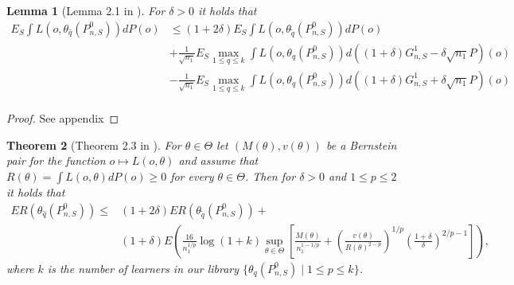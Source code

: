 \documentclass[11pt, a4paper]{article}
\newtheorem{theorem}{Theorem}
\newtheorem{lemma}[theorem]{Lemma}
\theoremstyle{definition}
\theoremstyle{remark}
\newcommand{\cl}{q}
\begin{document}
\begin{lemma}[Lemma 2.1 in \cite{vaart06}]
   For $ \delta > 0 $ it holds that
   \begin{align*}
       E_{S} \int L(o, \theta_{ \hat{\cl}}(P_{n, S}^{0})) dP(o) &\leq (1 + 2 \delta) E_{S} \int L(o, \theta_{ \tilde{\cl} }(P_{n, S}^{0})) d P(o) \\ 
                                                                &+\frac{1}{\sqrt{n_1} } E_{S} \max_{1 \leq \cl \leq k} \int L(o, \theta_{\cl}(P_{n, S}^{0})) d ((1 + \delta) G_{n,S}^{1} - \delta \sqrt{n_1} P)(o)  \\
                                                                &-\frac{1}{\sqrt{n_1} } E_{S} \max_{1 \leq \cl \leq k} \int L(o, \theta_{\cl}(P_{n, S}^{0})) d ((1 + \delta) G_{n,S}^{1} + \delta \sqrt{n_1} P)(o)  \\
   \end{align*}
\end{lemma}
\begin{proof}
    See appendix
\end{proof}
\begin{theorem}[Theorem 2.3 in \cite{vaart06}] \label{finitesample}
   For $ \theta \in \Theta $ let $ (M(\theta) , v(\theta)) $ be a Bernstein pair for the function $ o \mapsto L(o, \theta) $ and assume that $ R(\theta) = \int L(o, \theta) d P(o) \geq 0 $ for every $ \theta \in \Theta $. Then for $ \delta > 0 $ and $ 1 \leq p \leq 2 $ it holds that 
   \begin{align*}
       ER(\theta_{\hat{\cl}}(P_{n, S}^{0})) \leq&(1 + 2 \delta) ER(\theta_{ \tilde{\cl}}(P_{n,S}^{0})) +\\
                                              &(1 + \delta) E \left(  \frac{16}{n_1^{1/p}} \log (1 +k) \sup_{\theta \in \Theta} \left[ \frac{M(\theta)}{n_1^{1-1/p}} +  \left( \frac{v(\theta)}{R(\theta)^{2-p}} \right)^{1/p} \left( \frac{1 + \delta}{\delta} \right)^{2/p-1} \right]\right),
   \end{align*}
   where $ k $ is the number of learners in our library $ \{\theta_{q}(P_{n, S}^{0}) \mid 1 \leq p \leq k\} $. 
\end{theorem}
\end{document}

